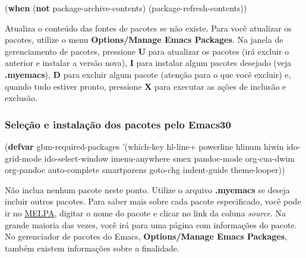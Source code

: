 \documentclass[]{article}
\newenvironment{Shaded}{}{}
\newcommand{\KeywordTok}[1]{\textcolor[rgb]{0.00,0.44,0.13}{\textbf{{#1}}}}
\newcommand{\FunctionTok}[1]{\textcolor[rgb]{0.02,0.16,0.49}{{#1}}}
\newcommand{\NormalTok}[1]{{#1}}
\begin{document}
\begin{Shaded}
\begin{Highlighting}[]
\NormalTok{(}\KeywordTok{when} \NormalTok{(}\KeywordTok{not} \NormalTok{package-archive-contents)}
  \NormalTok{(package-refresh-contents))}
\end{Highlighting}
\end{Shaded}

Atualiza o conteúdo das fontes de pacotes se não existe. Para você
atualizar os pacotes, utilize o menu \textbf{Options/Manage Emacs
Packages}. Na janela de gerenciamento de pacotes, pressione \textbf{U}
para atualizar os pacotes (irá excluir o anterior e instalar a versão
nova), \textbf{I} para instalar algum pacotes desejado (veja
\textbf{.myemacs}), \textbf{D} para excluir algum pacote (atenção para o
que você excluir) e, quando tudo estiver pronto, pressione \textbf{X}
para executar as ações de inclusão e exclusão.

\subsubsection{Seleção e instalação dos pacotes pelo
Emacs30}\label{seleuxe7uxe3o-e-instalauxe7uxe3o-dos-pacotes-pelo-emacs30}

\begin{Shaded}
\begin{Highlighting}[]
\NormalTok{(}\KeywordTok{defvar}\FunctionTok{ gbm-required-packages}
  \NormalTok{'(which-key}
    \NormalTok{hl-line+}
    \NormalTok{powerline}
    \NormalTok{hlinum}
    \NormalTok{hiwin}
    \NormalTok{ido-grid-mode}
    \NormalTok{ido-select-window}
    \NormalTok{imenu-anywhere}
    \NormalTok{smex}
    \NormalTok{pandoc-mode}
    \NormalTok{org-cua-dwim}
    \NormalTok{org-pandoc}
    \NormalTok{auto-complete}
    \NormalTok{smartparens}
    \NormalTok{goto-chg}
    \NormalTok{indent-guide}
    \NormalTok{theme-looper))}
\end{Highlighting}
\end{Shaded}

Não inclua nenhum pacote neste ponto. Utilize o arquivo
\textbf{.myemacs} se deseja incluir outros pacotes. Para saber mais
sobre cada pacote especificado, você pode ir no
\href{https://melpa.org/}{MELPA}, digitar o nome do pacote e clicar no
link da coluna \emph{source}. Na grande maioria das vezes, você irá para
uma página com informações do pacote. No gerenciador de pacotes do
Emacs, \textbf{Options/Manage Emacs Packages}, também existem
informações sobre a finalidade.
\end{document}
